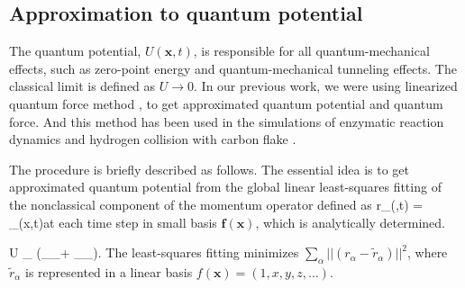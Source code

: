 \documentclass[11pt,letter,nocenter]{revtex4-1}
\begin{document}
\subsection{Approximation to quantum potential} \label{sec:lqf}

The quantum potential, $U(\bm x,t)$, is responsible for all quantum-mechanical effects, such as zero-point energy and quantum-mechanical tunneling effects. The classical limit is defined as $U \rightarrow 0$. 
In our previous work\cite{Garashchuk2011}, we were using linearized quantum force method \cite{garashchuk2004}, to get approximated quantum potential and quantum force.  And this method has been used in the simulations of enzymatic reaction dynamics \cite{Jim2012} and hydrogen collision with carbon flake \cite{Lei2013}. 

The procedure is briefly described as follows. 
The essential idea is to get approximated quantum potential from the global linear least-squares fitting of the nonclassical component of the momentum operator  defined as
\be r_\alpha(,t) = \approx {}_\alpha(\bm x,t)\label{eq:r}\ee at each time step in small basis $\bm{f}(\bm x)$, which is analytically determined. 

\be U \approx \sum_\alpha {} (_\alpha \cdot {}_\alpha + \grad_\alpha {}_\alpha). \label{eq:rfit} \ee
The least-squares fitting \cite{nurec2} minimizes $\sum_\alpha || (r_\alpha -\tilde{r}_\alpha) ||^2 $, where  $\tilde{r}_\alpha$ is 
represented in a linear basis $f(\bm x) = (1,x,y,z,\dots) .$


\end{document}
